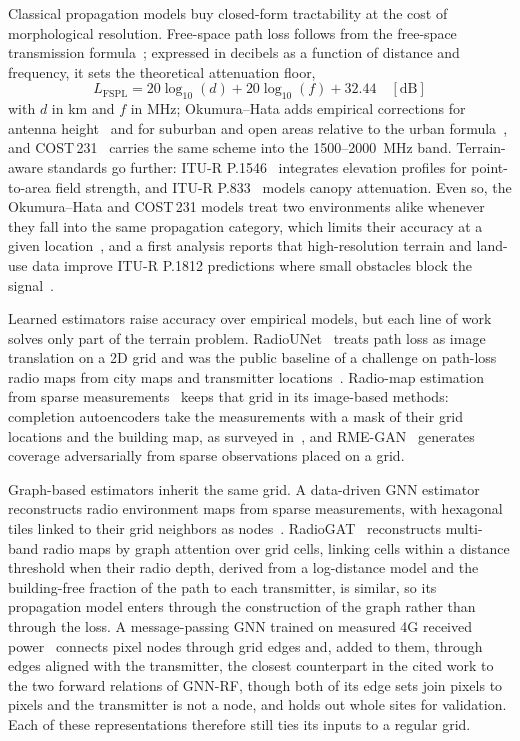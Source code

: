 \documentclass{ieeeaccess}
\begin{document}
Classical propagation models buy closed-form tractability at the cost of morphological resolution. Free-space path loss follows from the free-space transmission formula~\cite{friis1946note}; expressed in decibels as a function of distance and frequency, it sets the theoretical attenuation floor,
\begin{equation}
L_{\text{FSPL}} = 20\log_{10}(d) + 20\log_{10}(f) + 32.44 \quad [\text{dB}]
\label{eq:fspl}
\end{equation}
with $d$ in km and $f$ in MHz; Okumura--Hata adds empirical corrections for antenna height~\cite{hata1980empirical,itu529} and for suburban and open areas relative to the urban formula~\cite{hata1980empirical}, and COST\,231~\cite{cost231} carries the same scheme into the 1500--2000~MHz band. Terrain-aware standards go further: \mbox{ITU-R} P.1546~\cite{itu1546} integrates elevation profiles for point-to-area field strength, and \mbox{ITU-R} P.833~\cite{itu833} models canopy attenuation. Even so, the Okumura--Hata and COST\,231 models treat two environments alike whenever they fall into the same propagation category, which limits their accuracy at a given location~\cite{yapar2024overview}, and a first analysis reports that high-resolution terrain and land-use data improve ITU-R P.1812 predictions where small obstacles block the signal~\cite{hamada2025enhancing}.

Learned estimators raise accuracy over empirical models, but each line of work solves only part of the terrain problem. RadioUNet~\cite{levie2021radiounet} treats path loss as image translation on a 2D grid and was the public baseline of a challenge on path-loss radio maps from city maps and transmitter locations~\cite{yapar2023the}. Radio-map estimation from sparse measurements~\cite{feng2025recent} keeps that grid in its image-based methods: completion autoencoders take the measurements with a mask of their grid locations and the building map, as surveyed in~\cite{yapar2024overview}, and RME-GAN~\cite{zhang2023rme} generates coverage adversarially from sparse observations placed on a grid.

Graph-based estimators inherit the same grid. A data-driven GNN estimator reconstructs radio environment maps from sparse measurements, with hexagonal tiles linked to their grid neighbors as nodes~\cite{shibli2024data}. RadioGAT~\cite{li2024radiogat} reconstructs multi-band radio maps by graph attention over grid cells, linking cells within a distance threshold when their radio depth, derived from a log-distance model and the building-free fraction of the path to each transmitter, is similar, so its propagation model enters through the construction of the graph rather than through the loss. A message-passing GNN trained on measured 4G received power~\cite{bufort2025data} connects pixel nodes through grid edges and, added to them, through edges aligned with the transmitter, the closest counterpart in the cited work to the two forward relations of GNN-RF, though both of its edge sets join pixels to pixels and the transmitter is not a node, and holds out whole sites for validation. Each of these representations therefore still ties its inputs to a regular grid.
\end{document}
